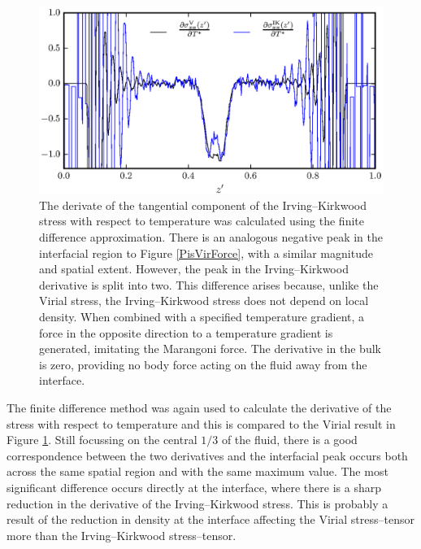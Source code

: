 \begin{figure}[h]
\centering
\includegraphics[scale=1.0]{PisIKForce}
\caption{The derivate of the tangential component of the Irving--Kirkwood stress with respect to temperature was calculated using the finite difference approximation.
There is an analogous negative peak in the interfacial region to Figure \ref{PisVirForce}, with a similar magnitude and spatial extent.
However, the peak in the Irving--Kirkwood derivative is split into two.
This difference arises because, unlike the Virial stress, the Irving--Kirkwood stress does not depend on local density.
When combined with a specified temperature gradient, a force in the opposite direction to a temperature gradient is generated, imitating the Marangoni force.
The derivative in the bulk is zero, providing no body force acting on the fluid away from the interface.
}
\label{PisIKForce}
\end{figure}
The finite difference method was again used to calculate the derivative of the stress with respect to temperature and this is compared to the Virial result in Figure \ref{PisIKForce}.
Still focussing on the central $1/3$ of the fluid, there is a good correspondence between the two derivatives and the interfacial peak occurs both across the same spatial region and with the same maximum value.
The most significant difference occurs directly at the interface, where there is a sharp reduction in the derivative of the Irving--Kirkwood stress.
This is probably a result of the reduction in density at the interface affecting the Virial stress--tensor more than the Irving--Kirkwood stress--tensor.
\FloatBarrier

